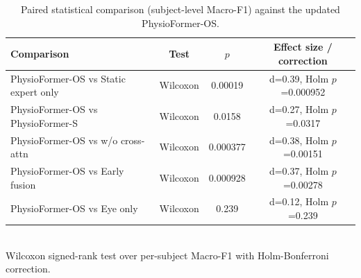 \begin{table}[htbp]
\centering
\caption{Paired statistical comparison (subject-level Macro-F1) against the updated PhysioFormer-OS.}
\label{tab:stats}
\begin{tabular}{lccc}
\toprule
Comparison & Test & $p$ & Effect size / correction \\
\midrule
PhysioFormer-OS vs Static expert only & Wilcoxon & 0.00019 & d=0.39, Holm $p$=0.000952 \\
PhysioFormer-OS vs PhysioFormer-S & Wilcoxon & 0.0158 & d=0.27, Holm $p$=0.0317 \\
PhysioFormer-OS vs w/o cross-attn & Wilcoxon & 0.000377 & d=0.38, Holm $p$=0.00151 \\
PhysioFormer-OS vs Early fusion & Wilcoxon & 0.000928 & d=0.37, Holm $p$=0.00278 \\
PhysioFormer-OS vs Eye only & Wilcoxon & 0.239 & d=0.12, Holm $p$=0.239 \\
\bottomrule
\end{tabular}
\\\footnotesize{Wilcoxon signed-rank test over per-subject Macro-F1 with Holm-Bonferroni correction.}
\end{table}
